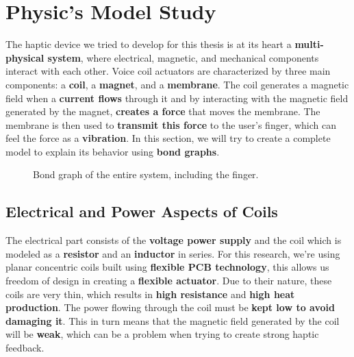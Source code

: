 \section{Physic's Model Study}
The haptic device we tried to develop for this thesis is at its heart a \textbf{multi-physical system}, where electrical, magnetic, and mechanical components interact with each other.
Voice coil actuators are characterized by three main components: a \textbf{coil}, a \textbf{magnet}, and a \textbf{membrane}. The coil generates a magnetic field when a \textbf{current flows} through it and by interacting with the magnetic field generated by the magnet, \textbf{creates a force} that moves the membrane. The membrane is then used to \textbf{transmit this force} to the user's finger, which can feel the force as a \textbf{vibration}.
In this section, we will try to create a complete model to explain its behavior using \textbf{bond graphs}.
\begin{figure}[H]
    \centering
    \resizebox{1\linewidth}{!}{
        
    } %
    \caption{Bond graph of the entire system, including the finger.}
    \label{fig: Total_bond-graph}
\end{figure}

\subsection{Electrical and Power Aspects of Coils}
The electrical part consists of the \textbf{voltage power supply} and the coil which is modeled as a \textbf{resistor} and an \textbf{inductor} in series. For this research, we're using planar concentric coils built using \textbf{flexible PCB technology}, this allows us freedom of design in creating a \textbf{flexible actuator}.
Due to their nature, these coils are very thin, which results in \textbf{high resistance} and \textbf{high heat production}. The power flowing through the coil must be \textbf{kept low to avoid damaging it}. This in turn means that the magnetic field generated by the coil will be \textbf{weak}, which can be a problem when trying to create strong haptic feedback.


